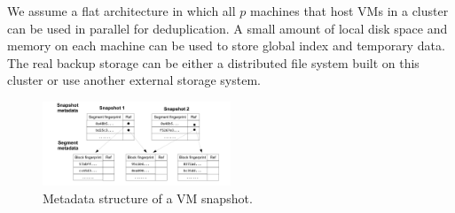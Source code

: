 \begin{itemize}

\end{itemize}


We assume a flat architecture in which  all $p$ machines that host VMs in a cluster can 
be used in parallel for deduplication. 
A small amount of local disk space and memory on each machine can be used 
to store global index and temporary data. 
The real backup storage can be either a distributed file system built on
this cluster  or use another  external storage system. 



\begin{figure}
\centering
\includegraphics[width=0.5\textwidth]{snapshotdata.pdf}
\caption{ Metadata structure of a VM snapshot.}
\label{fig:snapshot}
\end{figure}


